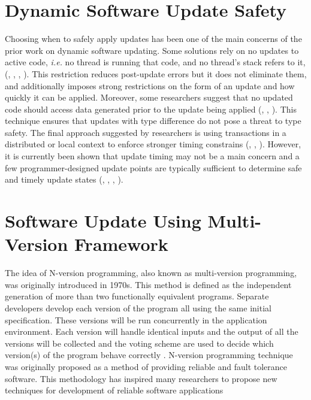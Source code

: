 \documentclass[a4paper,11pt,twoside]{report}
\begin{document}
\section{Dynamic Software Update Safety}
Choosing when to safely apply updates has been one of the main concerns of the prior work on dynamic software updating. Some solutions rely on no updates to active code, \textit{i.e.} no thread is running that code, and no thread's stack refers to it, (\cite{opus}, \cite{Ksplice}, \cite{K42}, \cite{Safety 43} ). This restriction reduces post-update errors but it does not eliminate them, and additionally imposes strong restrictions on the form of an update and how quickly it can be applied. Moreover, some researchers suggest that no updated code should access data generated prior to the update being applied (\cite{Safety 213}, \cite{Ginseng}, \cite{Safety 267}). This technique ensures that updates with type difference do not pose a threat to type safety. The final approach suggested by researchers is using transactions in a distributed or local context to enforce stronger timing constrains (\cite{Safety 173}, \cite{Safety 215}, \cite{Safety 279}). However, it is currently been shown that update timing may not be a main concern and a few programmer-designed update points are typically sufficient to determine safe and timely update states (\cite{Safety 213}, \cite{Kitsune}, \cite{Eiken}, \cite{Safety 108}). 

\section{Software Update Using Multi-Version Framework} \label{upgrade1} 
The idea of N-version programming, also known as multi-version programming, was originally introduced in 1970s. This method is defined as the independent generation of more than two functionally equivalent programs. Separate developers develop each version of the program all using the same initial specification. These versions will be run concurrently in the application environment. Each version will handle identical inputs and the output of all the versions will be collected and the voting scheme are used to decide which version(s) of the program behave correctly \cite{N-version programming}. N-version programming technique was originally proposed as a method of providing reliable and fault tolerance software. This methodology has inspired many researchers to propose new techniques for development of reliable software applications 
\end{document}
